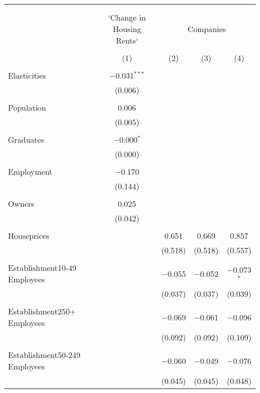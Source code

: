 
\begin{table}[!htbp] \centering 
  \caption{} 
  \label{} 
\begin{tabular}{@{\extracolsep{5pt}}lcccc} 
\\[-1.8ex]\hline 
\hline \\[-1.8ex] 
\\[-1.8ex] & `Change in Housing Rents` & \multicolumn{3}{c}{Companies} \\ 
\\[-1.8ex] & (1) & (2) & (3) & (4)\\ 
\hline \\[-1.8ex] 
 Elasticities & $-$0.031$^{***}$ &  &  &  \\ 
  & (0.006) &  &  &  \\ 
  & & & & \\ 
 Population & 0.006 &  &  &  \\ 
  & (0.005) &  &  &  \\ 
  & & & & \\ 
 Graduates & $-$0.000$^{*}$ &  &  &  \\ 
  & (0.000) &  &  &  \\ 
  & & & & \\ 
 Employment & $-$0.170 &  &  &  \\ 
  & (0.144) &  &  &  \\ 
  & & & & \\ 
 Owners & 0.025 &  &  &  \\ 
  & (0.042) &  &  &  \\ 
  & & & & \\ 
 Houseprices &  & 0.651 & 0.669 & 0.857 \\ 
  &  & (0.518) & (0.518) & (0.557) \\ 
  & & & & \\ 
 Establishment10-49 Employees &  & $-$0.055 & $-$0.052 & $-$0.073$^{*}$ \\ 
  &  & (0.037) & (0.037) & (0.039) \\ 
  & & & & \\ 
 Establishment250+ Employees &  & $-$0.069 & $-$0.061 & $-$0.096 \\ 
  &  & (0.092) & (0.092) & (0.109) \\ 
  & & & & \\ 
 Establishment50-249 Employees &  & $-$0.060 & $-$0.049 & $-$0.076 \\ 
  &  & (0.045) & (0.045) & (0.048) \\ 

\end{tabular}
\end{table}
